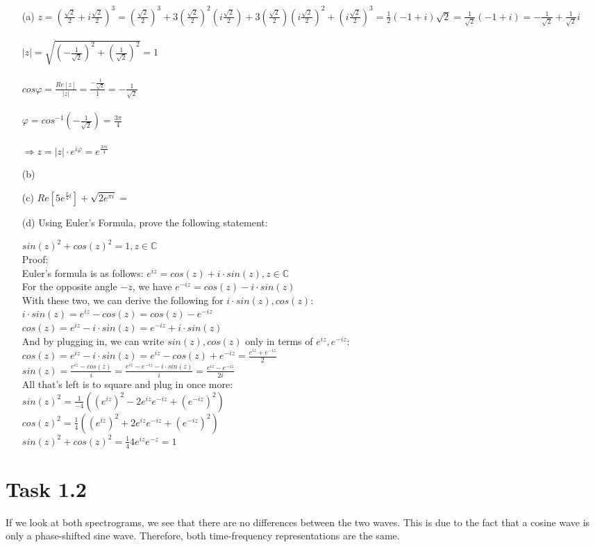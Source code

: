 \documentclass[12pt]{article}
\begin{document}
\begin{itemize}
    \item[(a)]
    $z = (\frac{\sqrt{2}}{2}+i\frac{\sqrt{2}}{2})^{3} = (\frac{\sqrt{2}}{2})^{3} + 3(\frac{\sqrt{2}}{2})^{2}(i\frac{\sqrt{2}}{2}) + 3(\frac{\sqrt{2}}{2})(i\frac{\sqrt{2}}{2})^{2} + (i\frac{\sqrt{2}}{2})^{3} = \frac{1}{2}(-1+i)\sqrt{2}=\frac{1}{\sqrt{2}}(-1+i)=-\frac{1}{\sqrt{2}}+\frac{1}{\sqrt{2}}i$\\\\
    $|z|=\sqrt{(-\frac{1}{\sqrt{2}})^{2}+(\frac{1}{\sqrt{2}})^{2}}=1$\\\\
    $cos\varphi=\frac{Re[z]}{|z|}=\frac{-\frac{1}{\sqrt{2}}}{1}=-\frac{1}{\sqrt{2}}$\\\\
    $\varphi=cos^{-1}(-\frac{1}{\sqrt{2}})=\frac{3\pi}{4}$\\\\
    $\Rightarrow z=|z|\cdot e^{i\varphi}=e^{\frac{3\pi i}{4}}$

    \item[(b)]

    \item[(c)]
    $Re[5e^{\frac{\pi}{4}i}]+\sqrt{2e^{\pi i}} = $
    \item[(d)]
    Using Euler's Formula, prove the following statement:

$sin(z)^2 + cos(z)^2 = 1, z \in \mathbb{C}$\\
Proof:\\
Euler's formula is as follows: $e^{iz} = cos(z) + i \cdot sin(z), z \in \mathbb{C}$\\
For the opposite angle $-z$, we have $e^{-iz} = cos(z) - i \cdot sin(z)$\\
With these two, we can derive the following for $i \cdot sin(z), cos(z)$:\\
$i \cdot sin(z) = e^{iz} - cos(z) = cos(z) - e^{-iz}$\\
$cos(z) = e^{iz} - i \cdot sin(z) = e^{-iz} + i \cdot sin(z)$\\
And by plugging in, we can write $sin(z), cos(z)$ only in terms of $e^{iz}, e^{-iz}$:\\
$cos(z) = e^{iz} - i \cdot sin(z) = e^{iz} - cos(z) + e^{-iz} = \frac{e^{iz} + e^{-iz}}{2}$\\
$sin(z) = \frac{e^{iz} - cos(z)}{i} = \frac{e^{iz} - e^{-iz} - i \cdot sin(z)}{i} =\frac{e^{iz} - e^{-iz}}{2i}$\\
All that's left is to square and plug in once more:\\
$sin(z)^2 = \frac{1}{-4}((e^{iz})^{2} - 2e^{iz}e^{-iz} + (e^{-iz})^2)$\\
$cos(z)^2 = \frac{1}{4}((e^{iz})^{2} + 2e^{iz}e^{-iz} + (e^{-iz})^{2})$\\
$sin(z)^{2} + cos(z)^{2} = \frac{1}{4}4e^{iz}e^{-z} = 1$\\

\end{itemize}
\section*{Task 1.2}
If we look at both spectrograms, we see that there are no differences between the two waves. This is due to the fact that a cosine wave is only a phase-shifted sine wave. Therefore, both time-frequency representations are the same.
\end{document}
